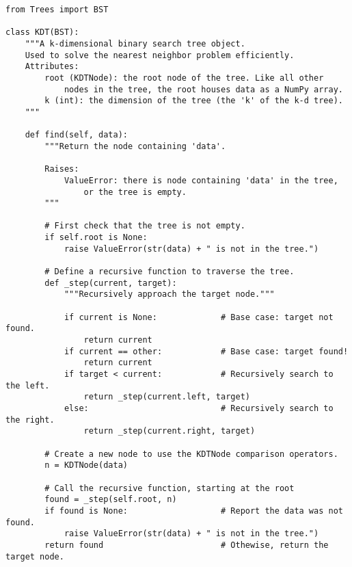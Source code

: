 \begin{lstlisting}
from Trees import BST

class KDT(BST):
    """A k-dimensional binary search tree object.
    Used to solve the nearest neighbor problem efficiently.
    Attributes:
        root (KDTNode): the root node of the tree. Like all other
            nodes in the tree, the root houses data as a NumPy array.
        k (int): the dimension of the tree (the 'k' of the k-d tree).
    """

	def find(self, data):
        """Return the node containing 'data'.
        
        Raises:
            ValueError: there is node containing 'data' in the tree,
                or the tree is empty.
        """

        # First check that the tree is not empty.
        if self.root is None:
            raise ValueError(str(data) + " is not in the tree.")
		
        # Define a recursive function to traverse the tree.
        def _step(current, target):
            """Recursively approach the target node."""
            
            if current is None:             # Base case: target not found.
                return current
            if current == other:            # Base case: target found!
                return current
            if target < current:            # Recursively search to the left.
                return _step(current.left, target)
            else:                           # Recursively search to the right.
                return _step(current.right, target)
        
        # Create a new node to use the KDTNode comparison operators.
        n = KDTNode(data)

        # Call the recursive function, starting at the root
        found = _step(self.root, n)
        if found is None:                   # Report the data was not found.
            raise ValueError(str(data) + " is not in the tree.")
        return found                        # Othewise, return the target node.
\end{lstlisting}

